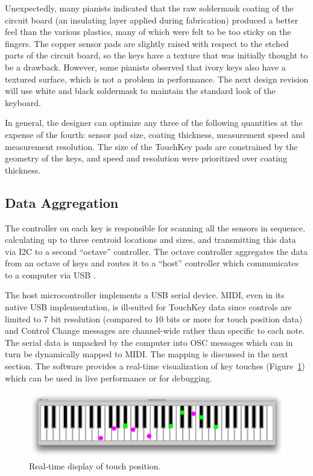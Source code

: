Unexpectedly, many pianists indicated that the raw soldermask coating of the circuit board (an insulating layer applied during fabrication) produced a better feel than the various plastics, many of which were felt to be too sticky on the fingers. The copper sensor pads are slightly raised with respect to the etched parts of the circuit board, so the keys have a texture that was initially thought to be a drawback. However, some pianists observed that ivory keys also have a textured surface, which is not a problem in performance. The next design revision will use white and black soldermask to maintain the standard look of the keyboard.

In general, the designer can optimize any three of the following quantities at the expense of the fourth: sensor pad size, coating thickness, measurement speed and measurement resolution. The size of the TouchKey pads are constrained by the geometry of the keys, and speed and resolution were prioritized over coating thickness.

\subsection{Data Aggregation}
The controller on each key is responsible for scanning all the sensors in sequence, calculating up to three centroid locations and sizes, and transmitting this data via I2C to a second ``octave'' controller. The octave controller aggregates the data from an octave of keys and routes it to a ``host'' controller which communicates to a computer via USB \cite{McPherson:2011}. 

The host microcontroller implements a USB serial device. MIDI, even in its native USB implementation, is ill-suited for TouchKey data since controls are limited to 7 bit resolution (compared to 10 bits or more for touch position data) and Control Change messages are channel-wide rather than specific to each note. The serial data is unpacked by the computer into OSC messages which can in turn be dynamically mapped to MIDI. The mapping is discussed in the next section. The software provides a real-time visualization of key touches (Figure~\ref{McPherson:fig:visual}) which can be used in live performance or for debugging.

\begin{figure}[t]
\includegraphics[width=\columnwidth]{fig5_display.png}
\caption{Real-time display of touch position.}
\label{McPherson:fig:visual}
\end{figure}

